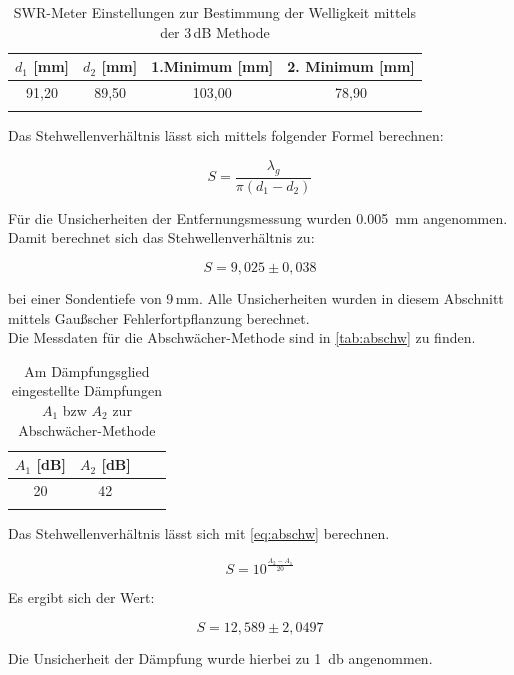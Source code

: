 \begin{table}
\centering
\caption{SWR-Meter Einstellungen zur Bestimmung der Welligkeit mittels der 3\,dB Methode}
\begin{tabular}{c c c c}
\toprule
{$d_1$ [mm]} & {$d_2$ [mm]}& {1.Minimum [mm]}& {2. Minimum [mm]}\\
\midrule
91,20 & 89,50 & 103,00 & 78,90\\
\bottomrule
\label{tab:3db}
\end{tabular}
\end{table}

Das Stehwellenverhältnis lässt sich mittels folgender Formel berechnen:

\begin{equation}
S = \frac{\lambda_g}{\pi (d_1 - d_2)}
\label{eq:welligkeit1}
\end{equation}

Für die Unsicherheiten der Entfernungsmessung wurden \SI{0,005}{\milli\metre} angenommen. Damit berechnet sich das Stehwellenverhältnis zu:

\begin{equation}
S = 9,025 \pm 0,038
\label{eq:welligkeit2}
\end{equation}

bei einer Sondentiefe von 9\,mm. Alle Unsicherheiten wurden in diesem Abschnitt mittels Gaußscher Fehlerfortpflanzung berechnet.\\
Die Messdaten für die Abschwächer-Methode sind in \autoref{tab:abschw} zu finden.


\begin{table}
\centering
\caption{Am Dämpfungsglied eingestellte Dämpfungen $A_1$ bzw $A_2$ zur Abschwächer-Methode}
\begin{tabular}{c c c c}
\toprule
{$A_1$ [dB]} & {$A_2$ [dB]}\\
\midrule
20 & 42\\
\bottomrule
\label{tab:abschw}
\end{tabular}
\end{table}

Das Stehwellenverhältnis lässt sich mit \autoref{eq:abschw} berechnen.

\begin{equation}
S = 10^{\frac{A_2 - A_1}{20}}
\label{eq:abschw}
\end{equation}

Es ergibt sich der Wert:

\begin{equation}
S = 12,589 \pm 2,0497
\label{eq:abschw2}
\end{equation}

Die Unsicherheit der Dämpfung wurde hierbei zu \SI{1}{\decibel}  angenommen.





































